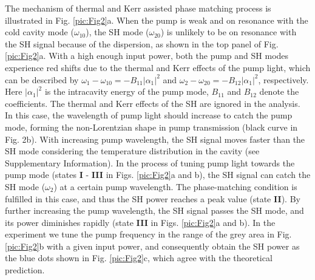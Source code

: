 \documentclass[a4paper,8pt,hyperref, twocolumn, aps, prl]{article}
\begin{document}
The mechanism of thermal and Kerr assisted phase matching process is illustrated in Fig. \ref{pic:Fig2}a.
When the pump is weak and on resonance with the cold cavity mode ($\omega_{10}$), the SH mode ($\omega_{20}$) is unlikely to be on resonance with the SH signal because of the dispersion, as shown in the top panel of Fig. \ref{pic:Fig2}a.
With a high enough input power, both the pump and SH modes experience red shifts due to the thermal and Kerr effects of the pump light, which can be described by $\omega_1-\omega_{10} = -B_{11}|\alpha_1|^2$ and $\omega_2-\omega_{20} = -B_{12}|\alpha_1|^2$, respectively. Here $|\alpha_1|^2$ is the intracavity energy of the pump mode, $B_{11}$ and $B_{12}$ denote the coefficients.
The thermal and Kerr effects of the SH are ignored in the analysis.
In this case, the wavelength of pump light should increase to catch the pump mode, forming the non-Lorentzian shape in pump transmission (black curve in Fig. 2b).
With increasing pump wavelength, the SH signal moves faster than the SH mode considering the temperature distribution in the cavity (see Supplementary Information).
In the process of tuning pump light towards the pump mode (states \textbf{I} - \textbf{III} in Figs. \ref{pic:Fig2}a and b), the SH signal can catch the SH mode ($\omega_2$) at a certain pump wavelength.
The phase-matching condition is fulfilled in this case, and thus the SH power reaches a peak value (state \textbf{II}).
By further increasing the pump wavelength, the SH signal passes the SH mode, and its power diminishes rapidly (state \textbf{III} in Figs. \ref{pic:Fig2}a and b).
In the experiment we tune the pump frequency in the range of the grey area in Fig. \ref{pic:Fig2}b with a given input power, and consequently obtain the SH power as the blue dots shown in Fig. \ref{pic:Fig2}c, which agree with the theoretical prediction.
\end{document}
